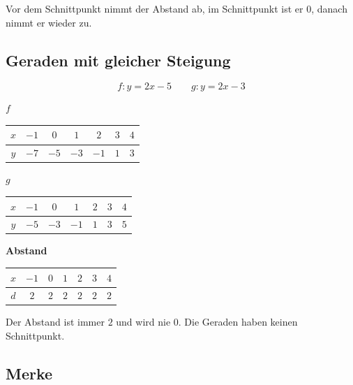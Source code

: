 \documentclass[a4paper]{scrartcl}
\begin{document}
\medskip
Vor dem Schnittpunkt nimmt der Abstand ab, im Schnittpunkt ist er $0$, danach nimmt er wieder zu.
\subsection*{Geraden mit gleicher Steigung}
$$f\colon y= 2x -5 \qquad g\colon y= 2x -3$$

\begin{minipage}{0.5\linewidth}
\end{minipage}
\hfill
\begin{minipage}{0.56\linewidth}
\small\renewcommand{\arraystretch}{1.2}
\textbf{$f$}\\[0.5mm]
\begin{tabular}{|c|c|c|c|c|c|c|}
\hline
$x$ & $-1$ & $0$ & $1$ & $2$ & $3$ & $4$ \\
\hline
$y$ & $-7$ & $-5$ & $-3$ & $-1$ & $1$ & $3$ \\
\hline
\end{tabular}

\medskip
\textbf{$g$}\\[0.5mm]
\begin{tabular}{|c|c|c|c|c|c|c|}
\hline
$x$ & $-1$ & $0$ & $1$ & $2$ & $3$ & $4$ \\
\hline
$y$ & $-5$ & $-3$ & $-1$ & $1$ & $3$ & $5$ \\
\hline
\end{tabular}

\medskip
\textbf{Abstand}\\[0.5mm]
\begin{tabular}{|c|c|c|c|c|c|c|}
\hline
$x$ & $-1$ & $0$ & $1$ & $2$ & $3$ & $4$ \\
\hline
$d$ & $2$ & $2$ & $2$ & $2$ & $2$ & $2$ \\
\hline
\end{tabular}
\end{minipage}

\medskip
Der Abstand ist immer $2$ und wird nie $0$. Die Geraden haben keinen Schnittpunkt.


\subsection*{Merke}

\end{document}

